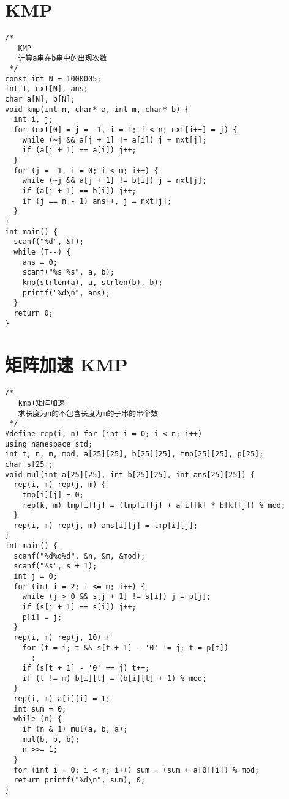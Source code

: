 \section{KMP}
\begin{lstlisting}
/*
   KMP
   计算a串在b串中的出现次数
 */
const int N = 1000005;
int T, nxt[N], ans;
char a[N], b[N];
void kmp(int n, char* a, int m, char* b) {
  int i, j;
  for (nxt[0] = j = -1, i = 1; i < n; nxt[i++] = j) {
    while (~j && a[j + 1] != a[i]) j = nxt[j];
    if (a[j + 1] == a[i]) j++;
  }
  for (j = -1, i = 0; i < m; i++) {
    while (~j && a[j + 1] != b[i]) j = nxt[j];
    if (a[j + 1] == b[i]) j++;
    if (j == n - 1) ans++, j = nxt[j];
  }
}
int main() {
  scanf("%d", &T);
  while (T--) {
    ans = 0;
    scanf("%s %s", a, b);
    kmp(strlen(a), a, strlen(b), b);
    printf("%d\n", ans);
  }
  return 0;
}
\end{lstlisting}
\section{矩阵加速 KMP}
\begin{lstlisting}
/*
   kmp+矩阵加速
   求长度为n的不包含长度为m的子串的串个数
 */
#define rep(i, n) for (int i = 0; i < n; i++)
using namespace std;
int t, n, m, mod, a[25][25], b[25][25], tmp[25][25], p[25];
char s[25];
void mul(int a[25][25], int b[25][25], int ans[25][25]) {
  rep(i, m) rep(j, m) {
    tmp[i][j] = 0;
    rep(k, m) tmp[i][j] = (tmp[i][j] + a[i][k] * b[k][j]) % mod;
  }
  rep(i, m) rep(j, m) ans[i][j] = tmp[i][j];
}
int main() {
  scanf("%d%d%d", &n, &m, &mod);
  scanf("%s", s + 1);
  int j = 0;
  for (int i = 2; i <= m; i++) {
    while (j > 0 && s[j + 1] != s[i]) j = p[j];
    if (s[j + 1] == s[i]) j++;
    p[i] = j;
  }
  rep(i, m) rep(j, 10) {
    for (t = i; t && s[t + 1] - '0' != j; t = p[t])
      ;
    if (s[t + 1] - '0' == j) t++;
    if (t != m) b[i][t] = (b[i][t] + 1) % mod;
  }
  rep(i, m) a[i][i] = 1;
  int sum = 0;
  while (n) {
    if (n & 1) mul(a, b, a);
    mul(b, b, b);
    n >>= 1;
  }
  for (int i = 0; i < m; i++) sum = (sum + a[0][i]) % mod;
  return printf("%d\n", sum), 0;
}
\end{lstlisting}

